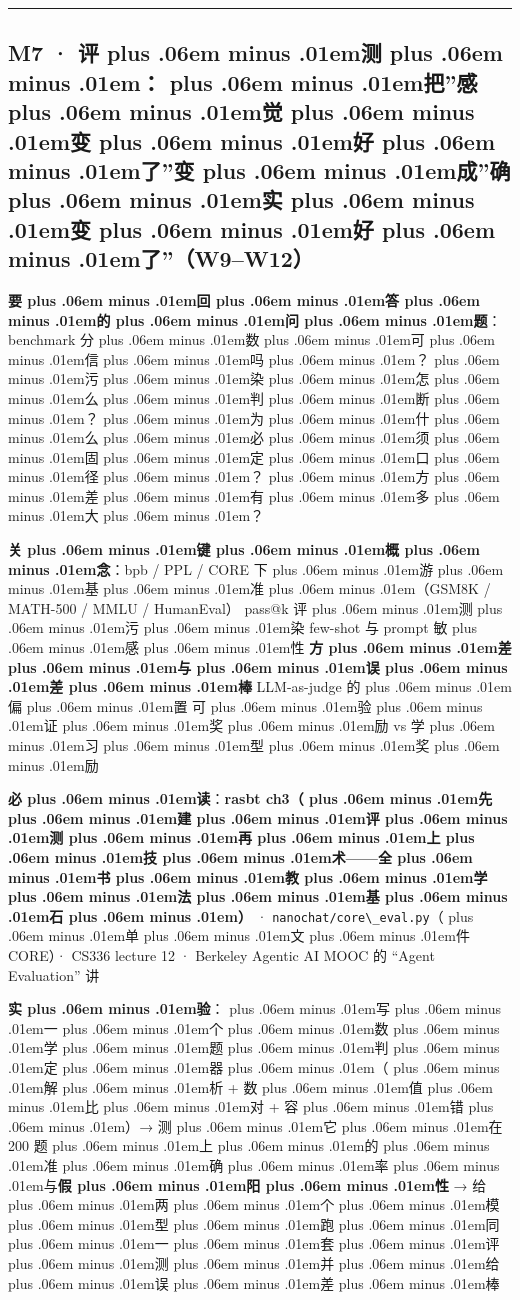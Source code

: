 \documentclass[
]{article}
\newcommand{\passthrough}[1]{#1}
\def\zh#1{{\zhfont #1}}
\def\sym#1{{\symfont #1}}
\def\zhglue{\hskip0pt plus .06em minus .01em}
\begin{document}
\begin{center}\rule{0.5\linewidth}{0.5pt}\end{center}

\subsection{M7 \sym{·} \zh{评\zhglue 测\zhglue ：\zhglue 把}''\zh{感\zhglue 觉\zhglue 变\zhglue 好\zhglue 了}''\zh{变\zhglue 成}''\zh{确\zhglue 实\zhglue 变\zhglue 好\zhglue 了}''\zh{（}W9--W12\zh{）}}\label{m7-ux8bc4ux6d4bux628aux611fux89c9ux53d8ux597dux4e86ux53d8ux6210ux786eux5b9eux53d8ux597dux4e86w9w12}

\textbf{\zh{要\zhglue 回\zhglue 答\zhglue 的\zhglue 问\zhglue 题}}\zh{：}benchmark \zh{分\zhglue 数\zhglue 可\zhglue 信\zhglue 吗\zhglue ？\zhglue 污\zhglue 染\zhglue 怎\zhglue 么\zhglue 判\zhglue 断\zhglue ？\zhglue 为\zhglue 什\zhglue 么\zhglue 必\zhglue 须\zhglue 固\zhglue 定\zhglue 口\zhglue 径\zhglue ？\zhglue 方\zhglue 差\zhglue 有\zhglue 多\zhglue 大\zhglue ？}

\textbf{\zh{关\zhglue 键\zhglue 概\zhglue 念}}\zh{：}bpb / PPL / CORE \textbar{} \zh{下\zhglue 游\zhglue 基\zhglue 准\zhglue （}GSM8K / MATH-500 / MMLU / HumanEval\zh{）}\textbar{} pass@k \textbar{} \zh{评\zhglue 测\zhglue 污\zhglue 染} \textbar{} few-shot \zh{与} prompt \zh{敏\zhglue 感\zhglue 性} \textbar{} \textbf{\zh{方\zhglue 差\zhglue 与\zhglue 误\zhglue 差\zhglue 棒}} \textbar{} LLM-as-judge \zh{的\zhglue 偏\zhglue 置} \textbar{} \zh{可\zhglue 验\zhglue 证\zhglue 奖\zhglue 励} vs \zh{学\zhglue 习\zhglue 型\zhglue 奖\zhglue 励}

\textbf{\zh{必\zhglue 读}}\zh{：}\textbf{rasbt ch3\zh{（\zhglue 先\zhglue 建\zhglue 评\zhglue 测\zhglue 再\zhglue 上\zhglue 技\zhglue 术}------\zh{全\zhglue 书\zhglue 教\zhglue 学\zhglue 法\zhglue 基\zhglue 石\zhglue ）}} \sym{·} \passthrough{\lstinline!nanochat/core\_eval.py!}\zh{（\zhglue 单\zhglue 文\zhglue 件} CORE\zh{）}\sym{·} CS336 lecture 12 \sym{·} Berkeley Agentic AI MOOC \zh{的} ``Agent Evaluation'' \zh{讲}

\textbf{\zh{实\zhglue 验}}\zh{：\zhglue 写\zhglue 一\zhglue 个\zhglue 数\zhglue 学\zhglue 题\zhglue 判\zhglue 定\zhglue 器\zhglue （\zhglue 解\zhglue 析} + \zh{数\zhglue 值\zhglue 比\zhglue 对} + \zh{容\zhglue 错\zhglue ）}\sym{→} \zh{测\zhglue 它\zhglue 在} 200 \zh{题\zhglue 上\zhglue 的\zhglue 准\zhglue 确\zhglue 率\zhglue 与}\textbf{\zh{假\zhglue 阳\zhglue 性}} \sym{→} \zh{给\zhglue 两\zhglue 个\zhglue 模\zhglue 型\zhglue 跑\zhglue 同\zhglue 一\zhglue 套\zhglue 评\zhglue 测\zhglue 并\zhglue 给\zhglue 误\zhglue 差\zhglue 棒}
\end{document}
